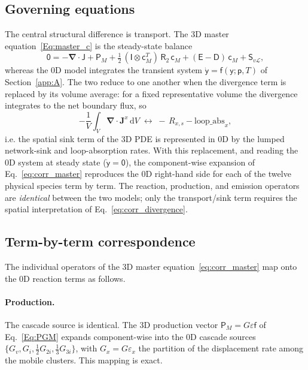 \documentclass{article}
\newcommand{\spvec}[1]{\bm{\mathsf{#1}}}   %
\newcommand{\spmat}[1]{\bm{\mathsf{#1}}}   %
\begin{document}
\subsection{Governing equations}
The central structural difference is transport. The 3D master equation~\eqref{Eq:master_c} is the steady-state balance
\begin{equation}\label{eq:corr_master}
\spvec{0}=-\bm\nabla\cdot\spvec{J}+\spvec{P}_M+\tfrac12\,(\spmat{I}\otimes\spvec{c}_M^T)\,\spmat{R}_2\,\spvec{c}_M+(\spmat{E}-\spmat{D})\,\spvec{c}_M+\spvec{S}_{v\mathcal L},
\end{equation}
whereas the 0D model integrates the transient system $\dot{\spvec{y}}=\spvec f(\spvec y;\spvec p,T)$ of Section~\ref{app:A}. The two reduce to one another when the divergence term is replaced by its volume average: for a fixed representative volume the divergence integrates to the net boundary flux, so
\begin{equation}\label{eq:corr_divergence}
-\frac{1}{V}\int_V \bm\nabla\cdot\bm J^x\,\mathrm dV \;\longleftrightarrow\; -\,R_{x,s}-\text{loop\_abs}_x ,
\end{equation}
i.e. the spatial sink term of the 3D PDE is represented in 0D by the lumped network-sink and loop-absorption rates. With this replacement, and reading the 0D system at steady state ($\dot{\spvec y}=\spvec 0$), the component-wise expansion of Eq.~\eqref{eq:corr_master} reproduces the 0D right-hand side for each of the twelve physical species term by term. The reaction, production, and emission operators are \emph{identical} between the two models; only the transport/sink term requires the spatial interpretation of Eq.~\eqref{eq:corr_divergence}.

\subsection{Term-by-term correspondence}
The individual operators of the 3D master equation~\eqref{eq:corr_master} map onto the 0D reaction terms as follows.

\paragraph{Production.} The cascade source is identical. The 3D production vector $\spvec{P}_M=G\varepsilon\spvec f$ of Eq.~\eqref{Eq:PGM} expands component-wise into the 0D cascade sources $\{G_v,G_i,\tfrac12 G_{2i},\tfrac13 G_{3i}\}$, with $G_x=G\varepsilon_x$ the partition of the displacement rate among the mobile clusters. This mapping is exact.
\end{document}
